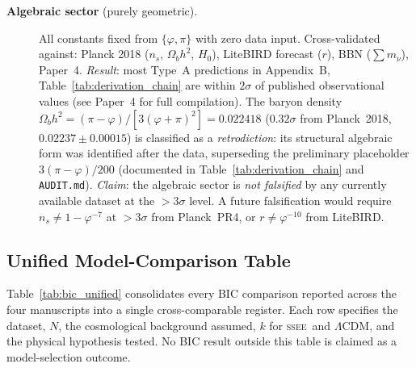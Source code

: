 \documentclass[12pt,a4paper]{article}
\newcommand{\SSEE}{\ifmmode\mathrm{SSEE}\else\textsc{ssee}\fi}
\begin{document}
\begin{description}
  \item[\textbf{Algebraic sector} (purely geometric).]
  All constants fixed from $\{\varphi,\pi\}$ with zero data input.
  Cross-validated against: Planck 2018 ($n_s$, $\Omega_b h^2$, $H_0$),
  LiteBIRD forecast ($r$), BBN ($\sum m_\nu$), Paper~4.
  \textit{Result}: most Type~A predictions in Appendix~B,
  Table~\ref{tab:derivation_chain} are within $2\sigma$ of published
  observational values (see Paper~4 for full compilation).
  The baryon density $\Omega_b h^2 = (\pi-\varphi)/[3(\varphi+\pi)^2] = 0.022418$
  ($0.32\sigma$ from Planck~2018, $0.02237\pm0.00015$) is classified as a
  \emph{retrodiction}: its structural algebraic form was identified after the
  data, superseding the preliminary placeholder $3(\pi-\varphi)/200$
  (documented in Table~\ref{tab:derivation_chain} and \texttt{AUDIT.md}).
  \textit{Claim}: the algebraic sector is \emph{not falsified} by any
  currently available dataset at the $>3\sigma$ level. A future falsification would require
  $n_s\neq1-\varphi^{-7}$ at $>3\sigma$ from Planck~PR4,
  or $r\neq\varphi^{-10}$ from LiteBIRD.

\end{description}

\subsection{Unified Model-Comparison Table}
\label{sec:bic_unified}

Table~\ref{tab:bic_unified} consolidates every BIC comparison reported
across the four manuscripts into a single cross-comparable register.
Each row specifies the dataset, $N$, the cosmological background assumed,
$k$ for \SSEE\ and $\Lambda$CDM, and the physical hypothesis tested.
No BIC result outside this table is claimed as a model-selection outcome.
\end{document}
